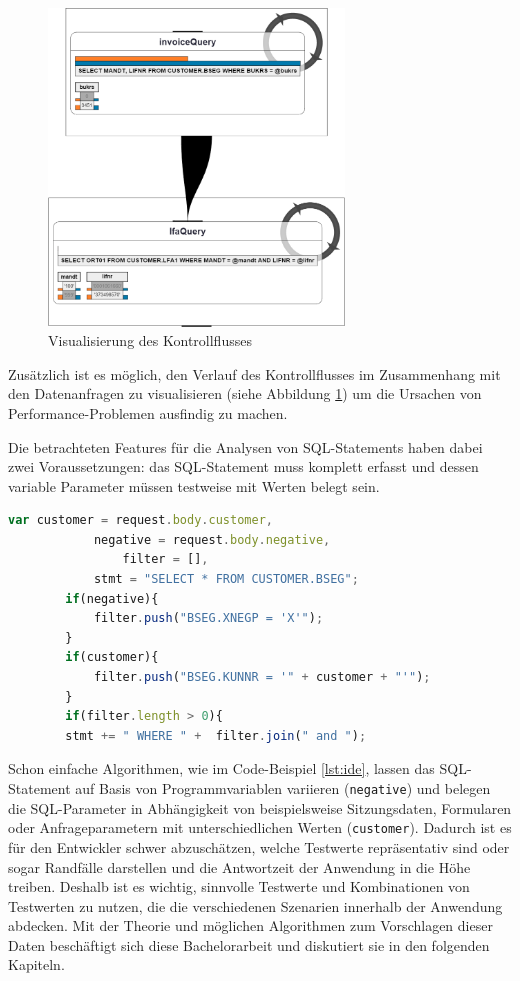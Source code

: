 \begin{figure}[ht]
	\centering
  \includegraphics[width=0.7\textwidth]{figures/feedback.png}
	\caption{Visualisierung des Kontrollflusses}
	\label{fig:feedback}
\end{figure}

Zusätzlich ist es möglich, den Verlauf des Kontrollflusses im Zusammenhang mit den Datenanfragen zu visualisieren \cite{Frahnow2014} (siehe Abbildung \ref{fig:feedback}) um die Ursachen von Performance-Problemen ausfindig zu machen.

Die betrachteten Features für die Analysen von SQL-Statements haben dabei zwei Voraussetzungen: das SQL-Statement muss komplett erfasst und dessen variable Parameter müssen testweise mit Werten belegt sein.

\begin{lstlisting}[caption={Variablen nehmen Einfluss auf die SQL-Query und -Parameter}, label={lst:ide}, language=JavaScript]
		var customer = request.body.customer,
		    negative = request.body.negative,
				filter = [],
		    stmt = "SELECT * FROM CUSTOMER.BSEG";
		if(negative){
			filter.push("BSEG.XNEGP = 'X'");
		}
		if(customer){
			filter.push("BSEG.KUNNR = '" + customer + "'");
		}
		if(filter.length > 0){
		stmt += " WHERE " +  filter.join(" and ");
\end{lstlisting}

Schon einfache Algorithmen, wie im Code-Beispiel \ref{lst:ide}, lassen das SQL-Statement auf Basis von Programmvariablen variieren (\texttt{negative}) und belegen die SQL-Parameter in Abhängigkeit von beispielsweise Sitzungsdaten, Formularen oder Anfrageparametern mit unterschiedlichen Werten (\texttt{customer}).
Dadurch ist es für den Entwickler schwer abzuschätzen, welche Testwerte repräsentativ sind oder sogar Randfälle darstellen und die Antwortzeit der Anwendung in die Höhe treiben.
Deshalb ist es wichtig, sinnvolle Testwerte und Kombinationen von Testwerten zu nutzen, die die verschiedenen Szenarien innerhalb der Anwendung abdecken.
Mit der Theorie und möglichen Algorithmen zum Vorschlagen dieser Daten beschäftigt sich diese Bachelorarbeit und diskutiert sie in den folgenden Kapiteln.

